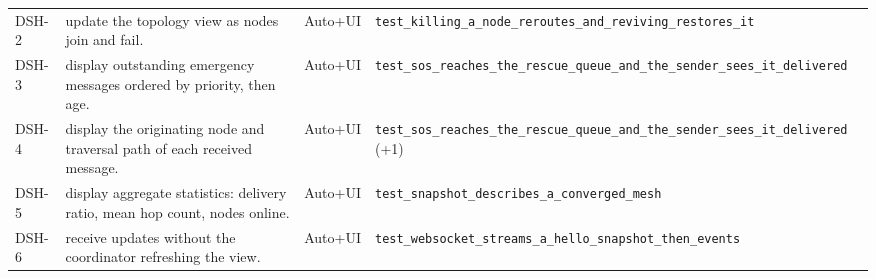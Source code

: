 \begin{longtable}{@{}p{1.25cm}p{6.3cm}p{1.65cm}p{6.95cm}@{}}
DSH-2 & update the topology view as nodes join and fail. & Auto+UI & \texttt{test\_\allowbreak{}killing\_\allowbreak{}a\_\allowbreak{}node\_\allowbreak{}reroutes\_\allowbreak{}and\_\allowbreak{}reviving\_\allowbreak{}restores\_\allowbreak{}it} \\
DSH-3 & display outstanding emergency messages ordered by priority, then age. & Auto+UI & \texttt{test\_\allowbreak{}sos\_\allowbreak{}reaches\_\allowbreak{}the\_\allowbreak{}rescue\_\allowbreak{}queue\_\allowbreak{}and\_\allowbreak{}the\_\allowbreak{}sender\_\allowbreak{}sees\_\allowbreak{}it\_\allowbreak{}delivered} \\
DSH-4 & display the originating node and traversal path of each received message. & Auto+UI & \texttt{test\_\allowbreak{}sos\_\allowbreak{}reaches\_\allowbreak{}the\_\allowbreak{}rescue\_\allowbreak{}queue\_\allowbreak{}and\_\allowbreak{}the\_\allowbreak{}sender\_\allowbreak{}sees\_\allowbreak{}it\_\allowbreak{}delivered} (+1) \\
DSH-5 & display aggregate statistics: delivery ratio, mean hop count, nodes online. & Auto+UI & \texttt{test\_\allowbreak{}snapshot\_\allowbreak{}describes\_\allowbreak{}a\_\allowbreak{}converged\_\allowbreak{}mesh} \\
DSH-6 & receive updates without the coordinator refreshing the view. & Auto+UI & \texttt{test\_\allowbreak{}websocket\_\allowbreak{}streams\_\allowbreak{}a\_\allowbreak{}hello\_\allowbreak{}snapshot\_\allowbreak{}then\_\allowbreak{}events} \\
\bottomrule
\end{longtable}
\endgroup
